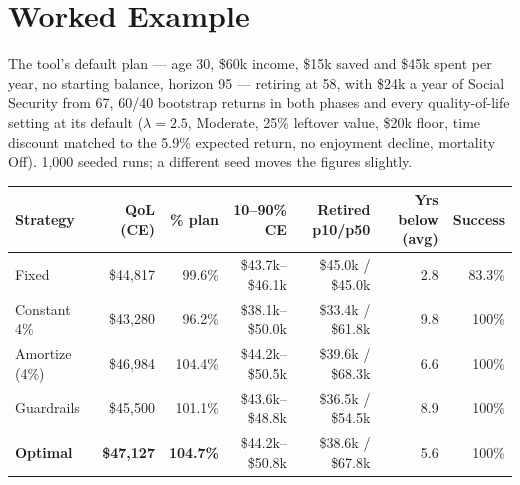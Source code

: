 \documentclass[11pt,letterpaper]{article}
\begin{document}
\section{Worked Example}
\label{sec:example}

The tool's default plan --- age 30, \$60k income, \$15k saved and \$45k spent per year, no starting balance, horizon 95 --- retiring at 58, with \$24k a year of Social Security from 67, 60/40 bootstrap returns in both phases and every quality-of-life setting at its default ($\lambda = 2.5$, Moderate, 25\% leftover value, \$20k floor, time discount matched to the 5.9\% expected return, no enjoyment decline, mortality Off). 1{,}000 seeded runs; a different seed moves the figures slightly.

\begin{center}
\small
\setlength{\tabcolsep}{4pt}
\begin{tabular}{@{}lrrrrrr@{}}
\toprule
Strategy & QoL (CE) & \% plan & 10--90\% CE & Retired p10/p50 & Yrs below (avg) & Success \\
\midrule
Fixed & \$44{,}817 & 99.6\% & \$43.7k--\$46.1k & \$45.0k / \$45.0k & 2.8 & 83.3\% \\
Constant 4\% & \$43{,}280 & 96.2\% & \$38.1k--\$50.0k & \$33.4k / \$61.8k & 9.8 & 100\% \\
Amortize (4\%) & \$46{,}984 & 104.4\% & \$44.2k--\$50.5k & \$39.6k / \$68.3k & 6.6 & 100\% \\
Guardrails & \$45{,}500 & 101.1\% & \$43.6k--\$48.8k & \$36.5k / \$54.5k & 8.9 & 100\% \\
\textbf{Optimal} & \textbf{\$47{,}127} & \textbf{104.7\%} & \$44.2k--\$50.8k & \$38.6k / \$67.8k & 5.6 & 100\% \\
\bottomrule
\end{tabular}
\end{center}
\end{document}
